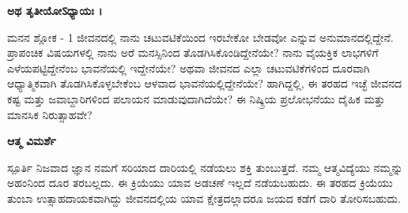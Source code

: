 \begin{center}
\textbf{ಅಥ ತೃತೀಯೋऽಧ್ಯಾಯಃ ।}
\end{center}


\newpage
\begin{mananam}{\mananamfont ಮನನ ಶ್ಲೋಕ - \textenglish{1}}
\footnotesize \mananamtext ಜೀವನದಲ್ಲಿ ನಾನು ಚಟುವಟಿಕೆಯಿಂದ ಇರಬೇಕೋ ಬೇಡವೋ ಎನ್ನುವ ಅನುಮಾನದಲ್ಲಿದ್ದೇನೆ. ಪ್ರಾಪಂಚಿಕ ವಿಷಯಗಳಲ್ಲಿ ನಾನು ಅರೆ ಮನಸ್ಸಿನಿಂದ ತೊಡಗಿಸಿಕೊಂಡಿದ್ದೇನೆಯೇ? ನಾನು ವೈಯಕ್ತಿಕ ಲಾಭಗಳಿಗೆ ಎಳೆಯಪಟ್ಟಿದ್ದೇನೆಂಬ ಭಾವನೆಯಲ್ಲಿ ಇದ್ದೇನೆಯೇ? ಅಥವಾ ಜೀವನದ ಎಲ್ಲಾ ಚಟುವಟಿಕೆಗಳಿಂದ ದೂರವಾಗಿ ಆಧ್ಯಾತ್ಮಿಕವಾಗಿ ತೊಡಗಿಸಿಕೊಳ್ಳಬೇಕೆಂಬ ಆಳವಾದ ಭಾವನೆಯಲ್ಲಿದ್ದೇನೆಯೇ?  ಹಾಗಿದ್ದಲ್ಲಿ, ಈ ತರಹದ ಇಚ್ಛೆ ಜೀವನದ ಕಷ್ಟ ಮತ್ತು ಜವಾಬ್ದಾರಿಗಳಿಂದ ಪಲಾಯನ ಮಾಡುವುದಾಗಿದೆಯೇ? ಈ ನಿಷ್ಕ್ರಿಯ ಪ್ರಲೋಭನೆಯು ದೈಹಿಕ ಮತ್ತು ಮಾನಸಿಕ ನಿರುತ್ಸಾಹವೇ?
\end{mananam}
\WritingHand\enspace\textbf{ಆತ್ಮ ವಿಮರ್ಶೆ}\\
\begin{inspiration}{\mananamfont ಸ್ಪೂರ್ತಿ}
\footnotesize \mananamtext ನಿಜವಾದ ಜ್ಞಾನ ನಮಗೆ ಸರಿಯಾದ ದಾರಿಯಲ್ಲಿ ನಡೆಯಲು ಶಕ್ತಿ ತುಂಬುತ್ತದೆ. ನಮ್ಮ  ಆತ್ಮವಿದ್ಯೆಯು ನಮ್ಮನ್ನು ಅಹಂನಿಂದ ದೂರ ತರಬಲ್ಲದು. ಈ ಕ್ರಿಯೆಯು ಯಾವ ಅಡಚಣೆ ಇಲ್ಲದೆ ನಡೆಯಬಹುದು. ಈ ತರಹದ ಕ್ರಿಯೆಯು ತುಂಬಾ ಉತ್ಸಾಹದಾಯಕವಾಗಿದ್ದು ಜೀವನದಲ್ಲಿಯ ಯಾವ ಕ್ಷೇತ್ರದಲ್ಲಾದರೂ ಜಯದ ಕಡೆಗೆ ದಾರಿ ತೋರಿಸಬಹುದು.
\end{inspiration}
\newpage

 
